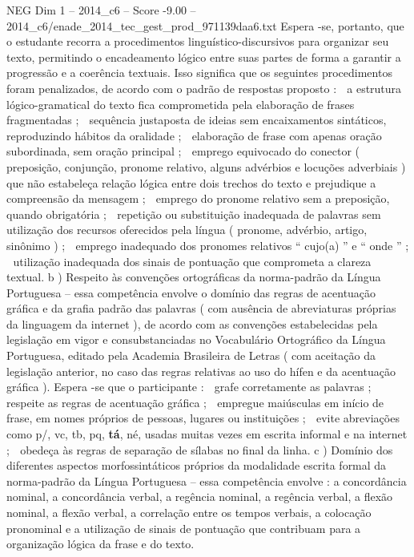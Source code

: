 \begin{textsample}{NEG Dim 1 – 2014\_c6 – Score -9.00 – 2014\_c6/enade\_2014\_tec\_gest\_prod\_971139daa6.txt}
Espera -se, portanto, que o estudante recorra a procedimentos linguístico-discursivos para organizar seu texto, permitindo o encadeamento lógico entre suas partes de forma a garantir a progressão e a coerência textuais.
Isso significa que os seguintes procedimentos foram penalizados, de acordo com o padrão de respostas proposto :  a estrutura lógico-gramatical do texto fica comprometida pela elaboração de frases fragmentadas ;  sequência justaposta de ideias sem encaixamentos sintáticos, reproduzindo hábitos da oralidade ;  elaboração de frase com apenas oração subordinada, sem oração principal ;  emprego equivocado do conector ( preposição, conjunção, pronome relativo, alguns advérbios e locuções adverbiais ) que não estabeleça relação lógica entre dois trechos do texto e prejudique a compreensão da mensagem ;  emprego do pronome relativo sem a preposição, quando obrigatória ;  repetição ou substituição inadequada de palavras sem utilização dos recursos oferecidos pela língua ( pronome, advérbio, artigo, sinônimo ) ;  emprego inadequado dos pronomes relativos “ cujo(a) ” e “ onde ” ;  utilização inadequada dos sinais de pontuação que comprometa a clareza textual. b ) Respeito às convenções ortográficas da norma-padrão da Língua Portuguesa – essa competência envolve o domínio das regras de acentuação gráfica e da grafia padrão das palavras ( com ausência de abreviaturas próprias da linguagem da internet ), de acordo com as convenções estabelecidas pela legislação em vigor e consubstanciadas no Vocabulário Ortográfico da Língua Portuguesa, editado pela Academia Brasileira de Letras ( com aceitação da legislação anterior, no caso das regras relativas ao uso do hífen e da acentuação gráfica ).
Espera -se que o participante :  grafe corretamente as palavras ;  respeite as regras de acentuação gráfica ;  empregue maiúsculas em início de frase, em nomes próprios de pessoas, lugares ou instituições ;  evite abreviações como p/, vc, tb, pq, \textbf{tá}, né, usadas muitas vezes em escrita informal e na internet ;  obedeça às regras de separação de sílabas no final da linha. c ) Domínio dos diferentes aspectos morfossintáticos próprios da modalidade escrita formal da norma-padrão da Língua Portuguesa – essa competência envolve : a concordância nominal, a concordância verbal, a regência nominal, a regência verbal, a flexão nominal, a flexão verbal, a correlação entre os tempos verbais, a colocação pronominal e a utilização de sinais de pontuação que contribuam para a organização lógica da frase e do texto.

\end{textsample}
